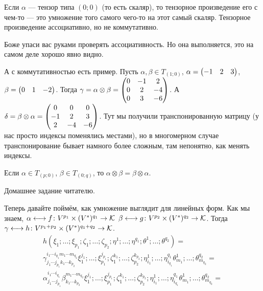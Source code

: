 \documentclass{article}
\begin{document}
\begin{itemize}
        \thm Если $\alpha$ --- тензор типа $(0;0)$ (то есть скаляр), то тензорное произведение его с чем-то --- это умножение того самого чего-то на этот самый скаляр.
        \thm Тензорное произведение ассоциативно, но не коммутативно.
        \begin{Proof}
            Боже упаси вас руками проверять ассоциативность. Но она выполняется, это на самом деле хорошо явно видно.
        \end{Proof}
        \begin{Example}
            А с коммутативностью есть пример. Пусть $\alpha,\beta\in T_{(1;0)}$, $\alpha=\left(\begin{matrix}-1 & 2 & 3\end{matrix}\right)$, $\beta=\left(\begin{matrix}0 & 1 & -2\end{matrix}\right)$. Тогда $\gamma=\alpha\otimes\beta=\left(\begin{matrix}0 & -1 & 2\\0 & 2 & -4\\0 & 3 & -6\end{matrix}\right)$. А $\delta=\beta\otimes\alpha=\left(\begin{matrix}0 & 0 & 0\\-1 & 2 & 3\\2 & -4 & -6\end{matrix}\right)$. Тут мы получили транспонированную матрицу (у нас просто индексы поменялись местами), но в многомерном случае транспонирование бывает намного более сложным, там непонятно, как менять индексы.
        \end{Example}
        \thm Если $\alpha\in T_{(p;0)}$, $\beta\in T_{(0;q)}$, то $\alpha\otimes\beta=\beta\otimes\alpha$.
        \begin{Proof}
            Домашнее задание читателю.
        \end{Proof}
        \begin{Comment}
            Теперь давайте поймём, как умножение выглядит для линейных форм. Как мы знаем, $\alpha\longleftrightarrow f\colon V^{p_1}\times(V^*)^{q_1}\to{\mathcal{K}}$
            $\beta\longleftrightarrow g\colon V^{p_2}\times(V^*)^{q_2}\to{\mathcal{K}}$. Тогда
            $\gamma\longleftrightarrow h\colon V^{p_1+p_2}\times(V^*)^{q_1+q_2}\to{\mathcal{K}}$.
            \[
            \begin{split}
                h(\xi_1;\ldots;\xi_{p_1};\zeta_1;\ldots;\zeta_{p_2};\eta^1;\ldots;\eta^{q_1};\theta^1;\ldots;\theta^{q_2})=\\
                \gamma^{i_1\cdots i_{q_1}m_1\cdots m_{q_2}}_{j_1\cdots j_{p_1}k_1\cdots k_{p_2}} \xi_1^{j_1};\ldots;\xi_{p_1}^{j_{p_1}};\zeta_1^{k_1};\ldots;\zeta_{p_2}^{k_{p_2}};\eta_{i_1}^1;\ldots;\eta_{i_{q_1}}^{q_1}\theta_{m_1}^1;\ldots;\theta_{m_{q_2}}^{q_2}=\\
                \alpha^{i_1\cdots i_{q_1}}_{j_1\cdots j_{p_1}}\beta^{m_1\cdots m_{q_2}}_{k_1\cdots k_{p_2}} \xi_1^{j_1};\ldots;\xi_{p_1}^{j_{p_1}};\zeta_1^{k_1};\ldots;\zeta_{p_2}^{k_{p_2}};\eta_{i_1}^1;\ldots;\eta_{i_{q_1}}^{q_1}\theta_{m_1}^1;\ldots;\theta_{m_{q_2}}^{q_2}=\\

\end{split}\]
\end{Comment}
\end{itemize}
\end{document}
